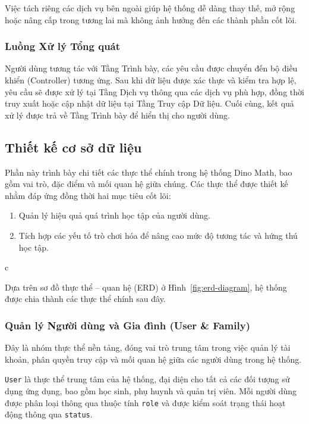 Việc tách riêng các dịch vụ bên ngoài giúp hệ thống dễ dàng thay thế, mở rộng hoặc nâng cấp trong tương lai mà không ảnh hưởng đến các thành phần cốt lõi.

\subsubsection{Luồng Xử lý Tổng quát}
Người dùng tương tác với Tầng Trình bày, các yêu cầu được chuyển đến bộ điều khiển (Controller) tương ứng.  
Sau khi dữ liệu được xác thực và kiểm tra hợp lệ, yêu cầu sẽ được xử lý tại Tầng Dịch vụ thông qua các dịch vụ phù hợp, đồng thời truy xuất hoặc cập nhật dữ liệu tại Tầng Truy cập Dữ liệu.  
Cuối cùng, kết quả xử lý được trả về Tầng Trình bày để hiển thị cho người dùng.

\subsection{Thiết kế cơ sở dữ liệu}
Phần này trình bày chi tiết các thực thể chính trong hệ thống Dino Math, bao gồm vai trò, đặc điểm và mối quan hệ giữa chúng. Các thực thể được thiết kế nhằm đáp ứng đồng thời hai mục tiêu cốt lõi:
\begin{enumerate}
	\item Quản lý hiệu quả quá trình học tập của người dùng.
	\item Tích hợp các yếu tố trò chơi hóa để nâng cao mức độ tương tác và hứng thú học tập.
\end{enumerate}
c

Dựa trên sơ đồ thực thể – quan hệ (ERD) ở Hình~\ref{fig:erd-diagram}, hệ thống được chia thành các thực thể chính sau đây.

\subsubsection{Quản lý Người dùng và Gia đình (User \& Family)}

Đây là nhóm thực thể nền tảng, đóng vai trò trung tâm trong việc quản lý tài khoản, phân quyền truy cập và mối quan hệ giữa các người dùng trong hệ thống.


\texttt{User} là thực thể trung tâm của hệ thống, đại diện cho tất cả các đối tượng sử dụng ứng dụng, bao gồm học sinh, phụ huynh và quản trị viên. 
Mỗi người dùng được phân loại thông qua thuộc tính \texttt{role} và được kiểm soát trạng thái hoạt động thông qua \texttt{status}.

